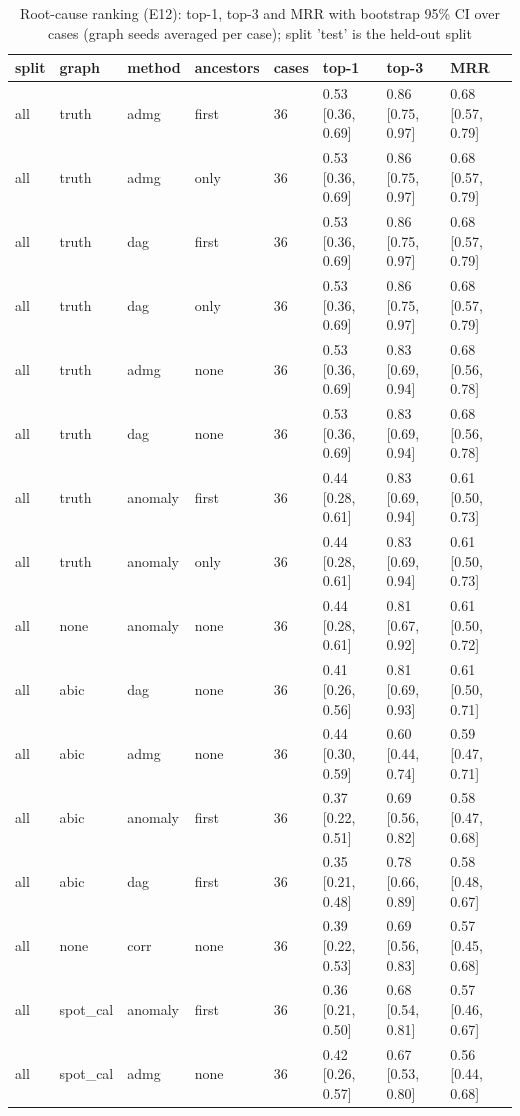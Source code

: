 \begin{table}[t]
\centering\footnotesize
\caption{Root-cause ranking (E12): top-1, top-3 and MRR with bootstrap 95\% CI over cases (graph seeds averaged per case); split 'test' is the held-out split}\label{tab:T6_rca}
\begin{tabular}{@{}llllllll@{}}
\toprule
split & graph & method & ancestors & cases & top-1 & top-3 & MRR\\
\midrule
all & truth & admg & first & 36 & 0.53 [0.36, 0.69] & 0.86 [0.75, 0.97] & 0.68 [0.57, 0.79]\\
all & truth & admg & only & 36 & 0.53 [0.36, 0.69] & 0.86 [0.75, 0.97] & 0.68 [0.57, 0.79]\\
all & truth & dag & first & 36 & 0.53 [0.36, 0.69] & 0.86 [0.75, 0.97] & 0.68 [0.57, 0.79]\\
all & truth & dag & only & 36 & 0.53 [0.36, 0.69] & 0.86 [0.75, 0.97] & 0.68 [0.57, 0.79]\\
all & truth & admg & none & 36 & 0.53 [0.36, 0.69] & 0.83 [0.69, 0.94] & 0.68 [0.56, 0.78]\\
all & truth & dag & none & 36 & 0.53 [0.36, 0.69] & 0.83 [0.69, 0.94] & 0.68 [0.56, 0.78]\\
all & truth & anomaly & first & 36 & 0.44 [0.28, 0.61] & 0.83 [0.69, 0.94] & 0.61 [0.50, 0.73]\\
all & truth & anomaly & only & 36 & 0.44 [0.28, 0.61] & 0.83 [0.69, 0.94] & 0.61 [0.50, 0.73]\\
all & none & anomaly & none & 36 & 0.44 [0.28, 0.61] & 0.81 [0.67, 0.92] & 0.61 [0.50, 0.72]\\
all & abic & dag & none & 36 & 0.41 [0.26, 0.56] & 0.81 [0.69, 0.93] & 0.61 [0.50, 0.71]\\
all & abic & admg & none & 36 & 0.44 [0.30, 0.59] & 0.60 [0.44, 0.74] & 0.59 [0.47, 0.71]\\
all & abic & anomaly & first & 36 & 0.37 [0.22, 0.51] & 0.69 [0.56, 0.82] & 0.58 [0.47, 0.68]\\
all & abic & dag & first & 36 & 0.35 [0.21, 0.48] & 0.78 [0.66, 0.89] & 0.58 [0.48, 0.67]\\
all & none & corr & none & 36 & 0.39 [0.22, 0.53] & 0.69 [0.56, 0.83] & 0.57 [0.45, 0.68]\\
all & spot\_cal & anomaly & first & 36 & 0.36 [0.21, 0.50] & 0.68 [0.54, 0.81] & 0.57 [0.46, 0.67]\\
all & spot\_cal & admg & none & 36 & 0.42 [0.26, 0.57] & 0.67 [0.53, 0.80] & 0.56 [0.44, 0.68]\\

\end{tabular}
\end{table}
